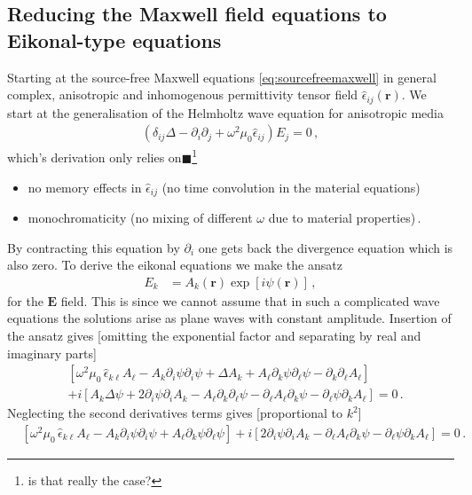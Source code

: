 \documentclass[12pt,a4paper,twoside,openright,BCOR10mm,headsepline,titlepage,abstracton,chapterprefix,final]{scrreprt}
\newcommand\Vector[1]{{\mathbf{#1}}}
\newcommand\Tensor[1]{\hat{#1}}
\newcommand\permittivity{\Tensor{\epsilon}}
\newcommand{\remark}[1]{{\color{red}$\blacksquare$}\footnote{{\color{red}#1}}}
\begin{document}
\subsection{Reducing the Maxwell field equations to Eikonal-type equations}
Starting at the source-free Maxwell equations \eqref{eq:sourcefreemaxwell} 
in general complex, anisotropic and inhomogenous
permittivity tensor field $\hat{\epsilon}_{ij}(\Vector{r})$.
We start at the generalisation of the Helmholtz wave equation for anisotropic media
\begin{align}
 (\delta_{ij} \Delta - \partial_i \partial_j + \omega^2 \mu_0 \permittivity_{ij}) E_j = 0\,,
\end{align}
which's derivation only relies on\remark{is that really the case?}
\begin{itemize}
 \item no memory effects in $\permittivity_{ij}$ (no time convolution in the material equations)
 \item monochromaticity (no mixing of different $\omega$ due to material properties)\,.
\end{itemize}
By contracting this equation by $\partial_i$ one gets back the divergence equation which is also zero.
To derive the eikonal equations we make the ansatz
\begin{align}
 E_k &= A_k(\Vector{r}) \exp[i \psi(\Vector{r})]\,,
\end{align}
for the $\Vector{E}$ field. This is since we cannot assume that in such a complicated wave equations 
the solutions arise as plane waves with constant amplitude. Insertion of the ansatz gives [omitting the 
exponential factor and separating by real and imaginary parts]
\begin{align}
    & \left[
     \omega^2 \mu_0\, \permittivity_{k\ell}A_\ell
    -A_k \partial_i \psi \partial_i \psi
   +\Delta A_k 
   +A_\ell \partial_k \psi \partial_\ell \psi
   -\partial_k \partial_\ell A_\ell
   \right] \nonumber\\&
   +i \left[
    A_k \Delta \psi
    +2\partial_i \psi \partial_i A_k
    -A_\ell \partial_k \partial_\ell \psi
    -\partial_\ell A_\ell \partial_k \psi
    -\partial_\ell \psi \partial_k A_\ell
   \right] = 0\,.
\end{align}
Neglecting the second derivatives terms gives [proportional to $k^2$]
\begin{align}
    & \left[
    \omega^2 \mu_0\, \permittivity_{k\ell}A_\ell 
    -A_k \partial_i \psi \partial_i \psi
   +A_\ell \partial_k \psi \partial_\ell \psi
   \right] 
   +i \left[
    2\partial_i \psi \partial_i A_k
    -\partial_\ell A_\ell \partial_k \psi
    -\partial_\ell \psi \partial_k A_\ell
   \right] = 0\,.\label{eq:protoeikonal}
\end{align}
\end{document}
